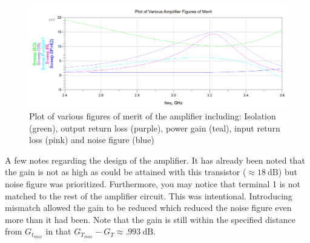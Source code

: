 \begin{figure}[H]
    \centering
    \includegraphics[width=0.8\linewidth]{Images/A2P1AmplifierFOM.png}
    \caption{Plot of various figures of merit of the amplifier including:
    Isolation (green), output return loss (purple), power gain (teal), input
return loss (pink) and noise figure (blue)}
    \label{fig:A2P1AmplifierFOM}
\end{figure}

A few notes regarding the design of the amplifier. It has already been noted
that the gain is not as high as could be attained with this transistor ($\approx
\SI{18}{\deci\bel}$) but noise figure was prioritized. Furthermore, you may
notice that terminal 1 is not matched to the rest of the amplifier circuit. This
was intentional. Introducing mismatch allowed the gain to be reduced which
reduced the noise figure even more than it had been. Note that the gain is still
within the specified distance from $G_{t_{max}}$ in that $G_{T_{max}} - G_T
\approx \SI{.993}{\deci\bel}$.
